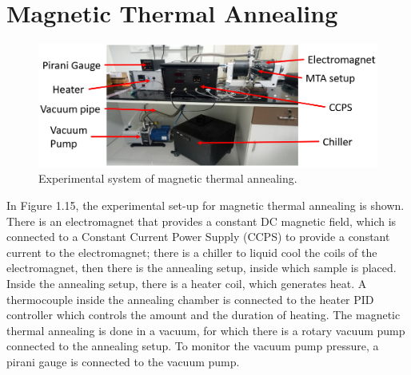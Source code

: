 \documentclass[12pt,a4paper,bold]{thesis}
\theoremstyle{thm}
\theoremstyle{definition}
\begin{document}
\section{Magnetic Thermal Annealing}
\begin{figure}[H]
	\centering
   \includegraphics[scale=0.56]{Images/27.png} 
   \caption{Experimental system of magnetic thermal annealing.}
\end{figure}
\indent \indent \indent In Figure 1.15, the experimental set-up for magnetic thermal annealing is shown. There is an electromagnet that provides a constant DC magnetic field, which is connected to a Constant Current Power Supply (CCPS) to provide a constant current to the electromagnet; there is a chiller to liquid cool the coils of the electromagnet, then there is the annealing setup, inside which sample is placed. Inside the annealing setup, there is a heater coil, which generates heat. A thermocouple inside the annealing chamber is connected to the heater PID controller which controls the amount and the duration of heating. The magnetic thermal annealing is done in a vacuum, for which there is a rotary vacuum pump connected to the annealing setup. To monitor the vacuum pump pressure, a pirani gauge is connected to the vacuum pump.
    
\end{document}
